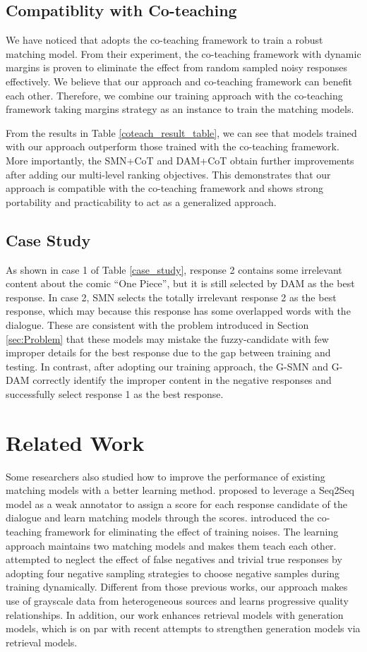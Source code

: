 \documentclass[11pt,a4paper]{article}
\begin{document}
	\subsection{Compatiblity with Co-teaching} We have noticed that \citet{feng2019learning} adopts the co-teaching framework to train a robust matching model. From their experiment, the co-teaching framework with dynamic margins is proven to eliminate the effect from random sampled noisy responses effectively. We believe that our approach and co-teaching framework can benefit each other. Therefore, we combine our training approach with the co-teaching framework taking margins strategy as an instance to train the matching models.
	
	From the results in Table \ref{coteach_result_table}, we can see that models trained with our approach outperform those trained with the co-teaching framework. More importantly, the SMN+CoT and DAM+CoT obtain further improvements after adding our multi-level ranking objectives. This demonstrates that our approach is compatible with the co-teaching framework and shows strong portability and practicability to act as a generalized approach.
	\subsection{Case Study} As shown in case 1 of Table \ref{case_study}, response 2 contains some irrelevant content about the comic ``One Piece'', but it is still selected by DAM as the best response. In case 2, SMN selects the totally irrelevant response 2 as the best response, which may because this response has some overlapped words with the dialogue. These are consistent with the problem introduced in Section \ref{sec:Problem} that these models may mistake the fuzzy-candidate with few improper details for the best response due to the gap between training and testing. In contrast, after adopting our training approach, the G-SMN and G-DAM correctly identify the improper content in the negative responses and successfully select response 1 as the best response.
	\section{Related Work}
	Some researchers also studied how to improve the performance of existing matching models with a better learning method. \citet{wu2018learning} proposed to leverage a Seq2Seq model as a weak annotator to assign a score for each response candidate of the dialogue and learn matching models through the scores. \citet{feng2019learning} introduced the co-teaching framework \cite{han2018co} for eliminating the effect of training noises. The learning approach maintains two matching models and makes them teach each other. \citet{li2019sampling} attempted to neglect the effect of false negatives and trivial true responses by adopting four negative sampling strategies to choose negative samples during training dynamically. Different from those previous works, our approach makes use of grayscale data from heterogeneous sources and learns progressive quality relationships. In addition, our work enhances retrieval models with generation models, which is on par with recent attempts \cite{cai2019skeleton,cai2019retrieval} to strengthen generation models via retrieval models.
\end{document}
